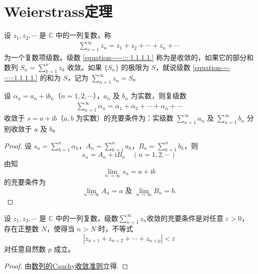 \documentclass[../../main.tex]{subfiles}%
\begin{document}
\section{Weierstrass定理}

\begin{definition}
设 \( z_1, z_2, \cdots \) 是 \( \mathbb{C} \) 中的一列复数，称
\begin{align}
\sum_{n=1}^{\infty} z_n = z_1 + z_2 + \cdots + z_n + \cdots \label{equation-----::::1.1.1.1.}
\end{align}
为一个复数项级数。级数 \eqref{equation-----::::1.1.1.1.} 称为是收敛的，如果它的部分和数列 \( S_n = \sum_{k=1}^{n} z_k \) 收敛。如果 \( \{S_n\} \) 的极限为 \( S \)，就说级数 \eqref{equation-----::::1.1.1.1.} 的和为 \( S \)，记为 \( \sum_{n=1}^{\infty} z_n = S \)。
\end{definition}

\begin{theorem}\label{theorem:复数项级数收敛充要条件}
设 $\alpha_n = a_n + \mathrm{i}b_n$（$n = 1,2,\cdots$），$a_n$ 及 $b_n$ 为实数，则复级数
\begin{align*}
\sum_{n=1}^{\infty}{\alpha _n}=\alpha _1+\alpha _2+\cdots +\alpha _n+\cdots 
\end{align*}
收敛于 $s = a + \mathrm{i}b$（$a,b$ 为实数）的充要条件为：实级数 $\sum_{n = 1}^{\infty} a_n$ 及 $\sum_{n = 1}^{\infty} b_n$ 分别收敛于 $a$ 及 $b$。
\end{theorem}
\begin{proof}

设 $s_n = \sum_{k = 1}^{n} \alpha_k$，$A_n = \sum_{k = 1}^{n} a_k$，$B_n = \sum_{k = 1}^{n} b_k$，则
\[
s_n = A_n + \mathrm{i}B_n \quad (n = 1,2,\cdots)
\]
由知
\[
\lim_{n \to \infty} s_n = a + \mathrm{i}b
\]
的充要条件为
\[
\lim_{n \to \infty} A_n = a \text{ 及 } \lim_{n \to \infty} B_n = b.
\]

\end{proof}

\begin{theorem}[Cauchy收敛准则]\label{theorem:复数域级数收敛的Cauchy收敛准则}
设 \( z_1, z_2, \cdots \) 是 \( \mathbb{C} \) 中的一列复数，级数$\sum_{n=1}^{\infty} z_n$收敛的充要条件是对任意 \( \varepsilon > 0 \)，存在正整数 \( N \)，使得当 \( n > N \) 时，不等式
\[
|z_{n + 1} + z_{n + 2} + \cdots + z_{n + p}| < \varepsilon
\]
对任意自然数 \( p \) 成立。
\end{theorem}
\begin{proof}

由\hyperref[theorem:复数域的Cauchy收敛准则]{数列的Cauchy收敛准则}立得.

\end{proof}
\end{document}
